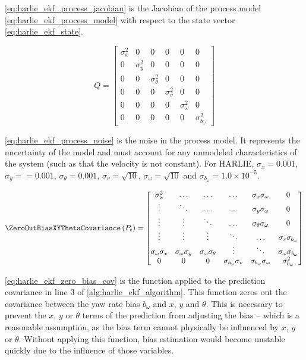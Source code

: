 \eqref{eq:harlie_ekf_process_jacobian} is the Jacobian of the process model \eqref{eq:harlie_ekf_process_model} with respect to the state vector \eqref{eq:harlie_ekf_state}.

\begin{equation}
	Q =
	\begin{bmatrix}
		\sigma_{x}^2 & 0 & 0 & 0 & 0 & 0 \\
		0 & \sigma_{y}^2 & 0 & 0 & 0 & 0 \\
		0 & 0 & \sigma_{\theta}^2 & 0 & 0 & 0 \\
		0 & 0 & 0 & \sigma_{v}^2 & 0 & 0 \\
		0 & 0 & 0 & 0 & \sigma_{\omega}^2 & 0 \\
		0 & 0 & 0 & 0 & 0 & \sigma_{b_{\omega}}^2
	\end{bmatrix}
	\label{eq:harlie_ekf_process_noise}
\end{equation}

\eqref{eq:harlie_ekf_process_noise} is the noise in the process model. It represents the uncertainty of the model and must account for any unmodeled characteristics of the system (such as that the velocity is not constant). For HARLIE, $\sigma_{x} = 0.001$, $\sigma_{y} == 0.001$, $\sigma_{\theta} = 0.001$, $\sigma_{v} = \sqrt{10}$, $\sigma_{\omega} = \sqrt{10}$ and $\sigma_{b_{\omega}} = 1.0\times 10^{-5}$.

\begin{equation}
	\mathsf{\ZeroOutBiasXYThetaCovariance}\left(P_t\right) = 
	\begin{bmatrix}
		\sigma_x^2 & \ldots & \ldots & \ldots & \sigma_x\sigma_\omega & 0 \\
		\vdots & \ddots & \ldots & \ldots & \sigma_y\sigma_\omega & 0 \\
		\vdots & \vdots & \ddots & \ldots & \sigma_\theta\sigma_\omega & 0 \\
		\vdots & \vdots & \vdots & \ddots & \ldots & \sigma_v\sigma_{b_{\omega}} \\
		\sigma_\omega\sigma_x & \sigma_\omega\sigma_y & \sigma_\omega\sigma_\theta & \vdots & \ddots & \sigma_\omega\sigma_{b_{\omega}} \\
		0 & 0 & 0 & \sigma_{b_{\omega}}\sigma_v & \sigma_{b_{\omega}}\sigma_\omega & \sigma_{b_{\omega}}^2
	\end{bmatrix}
	\label{eq:harlie_ekf_zero_bias_cov}
\end{equation}

\eqref{eq:harlie_ekf_zero_bias_cov} is the function applied to the prediction covariance in line 3 of \autoref{alg:harlie_ekf_algorithm}. This function zeros out the covariance between the yaw rate bias $b_{\omega}$ and $x$, $y$ and $\theta$. This is necessary to prevent the $x$, $y$ or $\theta$ terms of the prediction from adjusting the bias -- which is a reasonable assumption, as the bias term cannot physically be influenced by $x$, $y$ or $\theta$. Without applying this function, bias estimation would become unstable quickly due to the influence of those variables.

